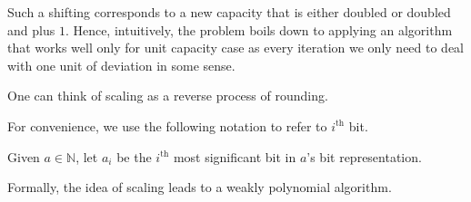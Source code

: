 Such a shifting corresponds to a new capacity that is either doubled or doubled and plus \(1\). Hence, intuitively, the problem boils down to applying an algorithm that works well only for unit capacity case as every iteration we only need to deal with one unit of deviation in some sense.

\begin{note}
	One can think of scaling as a reverse process of rounding.
\end{note}

For convenience, we use the following notation to refer to \(i^{\text{th} }\) bit.

\begin{notation}
	Given \(a \in \mathbb{N} \), let \(a_i\) be the \(i^{\text{th} }\) most significant bit in \(a\)'s bit representation.
\end{notation}

Formally, the idea of scaling leads to a weakly polynomial algorithm.

